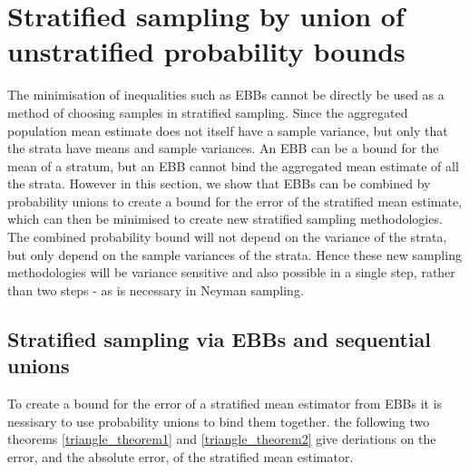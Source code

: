 \section{Stratified sampling by union of unstratified probability bounds}\label{section:old_statistics}

The minimisation of inequalities such as EBBs cannot be directly be used as a method of choosing samples in stratified sampling.
Since the aggregated population mean estimate does not itself have a sample variance, but only that the strata have means and sample variances.
An EBB can be a bound for the mean of a stratum, but an EBB cannot bind the aggregated mean estimate of all the strata.
However in this section, we show that EBBs can be combined by probability unions to create a bound for the error of the stratified mean estimate, which can then be minimised to create new stratified sampling methodologies.
The combined probability bound will not depend on the variance of the strata, but only depend on the sample variances of the strata.
Hence these new sampling methodologies will be variance sensitive and also possible in a single step, rather than two steps - as is necessary in Neyman sampling.

\subsection{Stratified sampling via EBBs and sequential unions}\label{section:unionising_ebbs}

To create a bound for the error of a stratified mean estimator from EBBs it is nessisary to use probability unions to bind them together.
the following two theorems \ref{triangle_theorem1} and \ref{triangle_theorem2} give deriations on the error, and the absolute error, of the stratified mean estimator.

